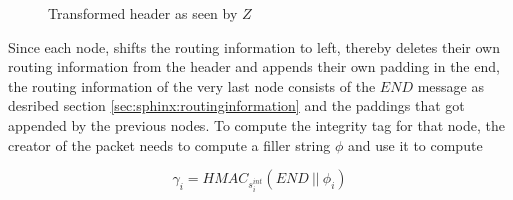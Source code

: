 \begin{figure}[H]
    \caption{Transformed header as seen by $Z$}
\end{figure}

Since each node, shifts the routing information to left, thereby deletes their own routing information from the header and appends their own padding in the end, the routing information of the very last node consists of the $END$ message as desribed section \ref{sec:sphinx:routinginformation} and the paddings that got appended by the previous nodes. To compute the integrity tag for that node, the creator of the packet needs to compute a filler string $\phi$ and use it to compute

$$\gamma_i = HMAC_{s_i^{int}}(END \ || \ \phi_i )$$
